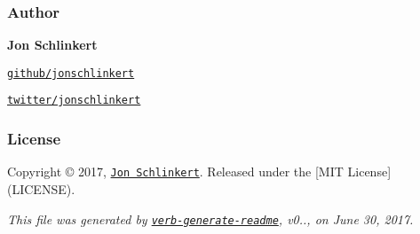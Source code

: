 \subsubsection*{Author}

{\bfseries Jon Schlinkert}


\begin{DoxyItemize}
\item \href{https://github.com/jonschlinkert}{\tt github/jonschlinkert}
\item \href{https://twitter.com/jonschlinkert}{\tt twitter/jonschlinkert}
\end{DoxyItemize}

\subsubsection*{License}

Copyright © 2017, \href{https://github.com/jonschlinkert}{\tt Jon Schlinkert}. Released under the \mbox{[}M\+IT License\mbox{]}(L\+I\+C\+E\+N\+SE).





{\itshape This file was generated by \href{https://github.com/verbose/verb-generate-readme}{\tt verb-\/generate-\/readme}, v0.., on June 30, 2017.} 